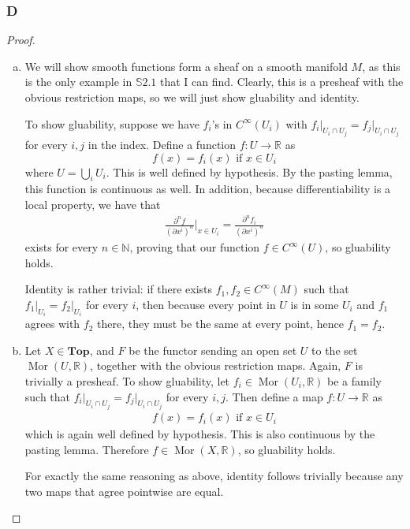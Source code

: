 \documentclass{article}
\newcommand{\R}{\mathbb{R}}
\newcommand{\N}{\mathbb{N}}
\renewcommand{\S}{\mathbb{S}}
\newcommand{\Top}{\mathbf{Top}} %
\DeclareMathOperator{\Mor}{\mathrm{Mor}}
\begin{document}
\subsubsection{D}\label{2.2.D}
\begin{proof}
    \begin{enumerate}[(a)]
    \item We will show smooth functions form a sheaf on a smooth manifold $M$, as this is the only example in $\S 2.1$ that I can find. Clearly, this is a presheaf with the obvious restriction maps, so we will just show gluability and identity.

    \vspace{\baselineskip}
    To show gluability, suppose we have $f_i$'s in $C^\infty(U_i)$ with $f_i\vert_{U_i\cap U_j}=f_j\vert_{U_i\cap U_j}$ for every $i,j$ in the index. Define a function $f:U\to \R$ as
    \[
    f(x)=f_i(x) \text{ if } x\in U_i
    \]
    where $U=\bigcup_i U_i$. This is well defined by hypothesis. By the pasting lemma, this function is continuous as well. In addition, because differentiability is a local property, we have that
    \begin{align*}
        \frac{\partial^n f}{(\partial x^i)^n}\vert_{x\in U_i}=\frac{\partial^n f_i}{(\partial x^i)^n}
    \end{align*}
    exists for every $n\in \N$, proving that our function $f\in C^\infty(U)$, so gluability holds.

    \vspace{\baselineskip}
    Identity is rather trivial: if there exists $f_1,f_2\in C^\infty(M)$ such that $f_1\vert_{U_i}=f_2\vert_{U_i}$ for every $i$, then because every point in $U$ is in some $U_i$ and $f_1$ agrees with $f_2$ there, they must be the same at every point, hence $f_1=f_2$.
    \item Let $X\in \Top$, and $F$ be the functor sending an open set $U$ to the set $\Mor(U,\R)$, together with the obvious restriction maps. Again, $F$ is trivially a presheaf. To show gluability, let $f_i\in \Mor(U_i,\R)$ be a family such that $f_i\vert_{U_i\cap U_j}=f_j\vert_{U_i\cap U_j}$ for every $i,j$. Then define a map $f:U\to \R$ as
    \begin{align*}
        f(x)= f_i(x) \text{ if }x\in U_i
    \end{align*}
    which is again well defined by hypothesis. This is also continuous by the pasting lemma. Therefore $f\in \Mor(X,\R)$, so gluability holds.

    \vspace{\baselineskip}
    For exactly the same reasoning as above, identity follows trivially because any two maps that agree pointwise are equal.
\end{enumerate}
\end{proof}
\end{document}
